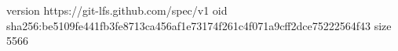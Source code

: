 version https://git-lfs.github.com/spec/v1
oid sha256:be5109fe441fb3fe8713ca456af1e73174f261c4f071a9cff2dce75222564f43
size 5566

